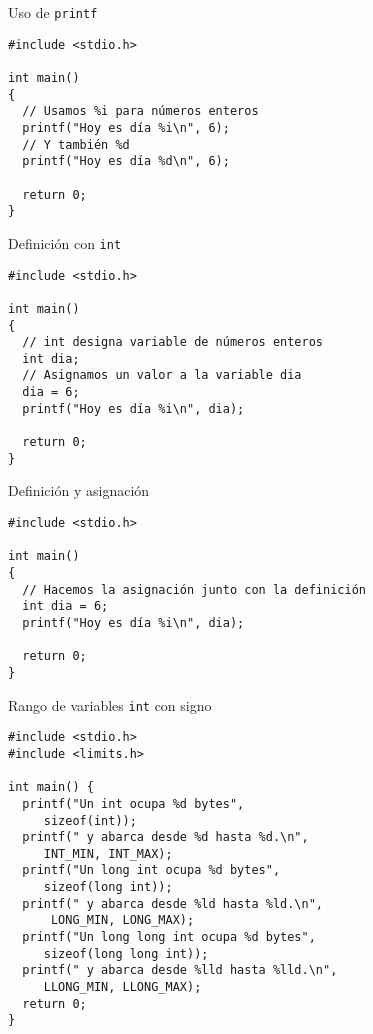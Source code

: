 \documentclass[xcolor={usenames,svgnames,dvipsnames}, aspectratio=169]{beamer}
\begin{document}
\begin{frame}[label={sec:org5a3b9b5},fragile]{Uso de \texttt{printf}}
 \lstset{language=C,label= ,caption= ,captionpos=b,numbers=none}
\begin{lstlisting}
#include <stdio.h>

int main()
{
  // Usamos %i para números enteros
  printf("Hoy es día %i\n", 6);
  // Y también %d
  printf("Hoy es día %d\n", 6);
  
  return 0;
}
\end{lstlisting}
\end{frame}

\begin{frame}[label={sec:orgcb7e218},fragile]{Definición con \texttt{int}}
 \lstset{language=C,label= ,caption= ,captionpos=b,numbers=none}
\begin{lstlisting}
#include <stdio.h>

int main()
{
  // int designa variable de números enteros
  int dia;
  // Asignamos un valor a la variable dia
  dia = 6;
  printf("Hoy es día %i\n", dia);

  return 0;
}
\end{lstlisting}
\end{frame}

\begin{frame}[label={sec:orgf1c9d45},fragile]{Definición y asignación}
 \lstset{language=C,label= ,caption= ,captionpos=b,numbers=none}
\begin{lstlisting}
#include <stdio.h>

int main()
{
  // Hacemos la asignación junto con la definición
  int dia = 6;
  printf("Hoy es día %i\n", dia);

  return 0;
}
\end{lstlisting}
\end{frame}

\begin{frame}[label={sec:org05c41e0},fragile,plain]{Rango de variables \texttt{int} con signo}
 \lstset{language=C,label= ,caption= ,captionpos=b,numbers=none}
\begin{lstlisting}
#include <stdio.h>
#include <limits.h>

int main() {
  printf("Un int ocupa %d bytes",
	 sizeof(int));
  printf(" y abarca desde %d hasta %d.\n",
	 INT_MIN, INT_MAX);
  printf("Un long int ocupa %d bytes",
	 sizeof(long int));
  printf(" y abarca desde %ld hasta %ld.\n",
	  LONG_MIN, LONG_MAX);
  printf("Un long long int ocupa %d bytes",
	 sizeof(long long int));
  printf(" y abarca desde %lld hasta %lld.\n",
	 LLONG_MIN, LLONG_MAX);
  return 0;
}
\end{lstlisting}
\end{frame}
\end{document}
